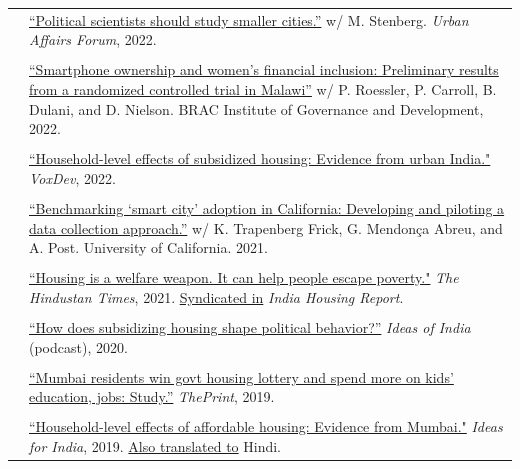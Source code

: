 \documentclass[letterpaper, 10.5pt]{article}
\begin{document}
\begin{longtable}{p{1.5in}p{5in}}
& \href{https://urbanaffairsreview.com/2022/10/11/why-political-scientists-should-study-smaller-cities/}{``Political scientists should study smaller cities.''} w/ M. Stenberg. \textit{Urban Affairs Forum}, 2022.\\
& \\
& \href{https://bigd.bracu.ac.bd/smartphone-ownership-and-pathways-to-womens-uptake-of-digital-financial-services-preliminary-results-from-a-randomized-controlled-trial-in-malawi/}{``Smartphone ownership and women’s financial inclusion: Preliminary results from a randomized controlled trial in Malawi''} w/ P. Roessler, P. Carroll, B. Dulani, and D. Nielson. BRAC Institute of Governance and Development, 2022.\\

& \\
& \href{https://voxdev.org/topic/infrastructure-urbanisation/household-level-effects-subsidised-housing-evidence-urban-india?utm_source=dlvr.it&utm_medium=twitter}{``Household-level effects of subsidized housing: Evidence from urban India."} \textit{VoxDev}, 2022.\\
& \\

& \href{https://escholarship.org/uc/item/3797p0ws}{``Benchmarking `smart city' adoption in California: Developing and piloting a data collection approach.''} w/ K. Trapenberg Frick, G. Mendon\c{c}a Abreu, and A. Post. University of California. 2021. \\
& \\

& \href{https://www.hindustantimes.com/opinion/housing-is-a-welfare-weapon-it-can-help-people-escape-poverty-101629993983576.html}{``Housing is a welfare weapon. It can help people escape poverty."} \textit{The Hindustan Times}, 2021. \href{https://indiahousingreport.in/outputs/opinion/housing-is-a-welfare-weapon-it-can-help-people-escape-poverty/}{Syndicated in} \textit{India Housing Report}. \\ 
& \\
&   \href{https://www.discoursemagazine.com/politics/2020/12/24/ideas-of-india-how-does-subsidizing-housing-prices-shape-political-behavior}{``How does subsidizing housing shape political behavior?''} \textit{Ideas of India} (podcast), 2020.\\

& \\
& \href{https://theprint.in/opinion/mumbai-residents-win-govt-housing-lottery-and-spend-more-on-kids-education-jobs-study/290485/}{``Mumbai residents win govt housing lottery and spend more on kids' education, jobs: Study.''} \textit{ThePrint}, 2019. \\
& \\
&\href{https://www.ideasforindia.in/topics/poverty-inequality/household-level-effects-of-affordable-housing-evidence-from-mumbai.html}{``Household-level effects of affordable housing: Evidence from Mumbai."} \textit{Ideas for India}, 2019.  \href{https://www.ideasforindia.in/topics/poverty-inequality/household-level-effects-of-affordable-housing-evidence-from-mumbai-hindi.html}{Also translated to} Hindi.\\


\end{longtable}
\end{document}
